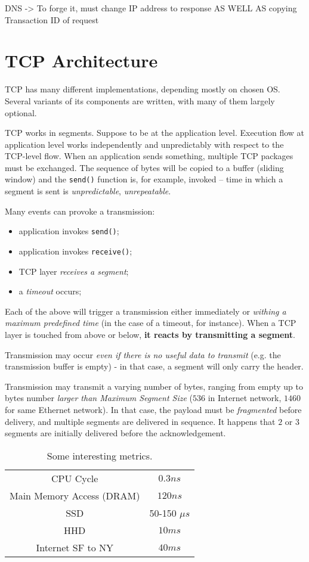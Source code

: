 \documentclass[a4paper, 12pt]{report}
\begin{document}
DNS -> To forge it, must change IP address to response AS WELL AS copying Transaction ID of request


\section{TCP Architecture}

TCP has many different implementations, depending mostly on chosen OS. Several
variants of its components are written, with many of them largely optional.

TCP works in segments. Suppose to be at the application level. Execution flow
at application level works independently and unpredictably with respect to the
TCP-level flow. When an application sends something, multiple TCP packages must
be exchanged. The sequence of bytes will be copied to a buffer (sliding window)
and the \texttt{send()} function is, for example, invoked \--- time in which a
segment is sent is \emph{unpredictable}, \emph{unrepeatable}.

Many events can provoke a transmission:

\begin{itemize}
	\item application invokes \texttt{send()};
	\item application invokes \texttt{receive()};
	\item TCP layer \emph{receives a segment};
	\item a \emph{timeout} occurs;
\end{itemize}

Each of the above will trigger a transmission either immediately or
\emph{withing a maximum predefined time} (in the case of a timeout, for
instance). When a TCP layer is touched from above or below, \textbf{it reacts
by transmitting a segment}.

Transmission may occur \emph{even if there is no useful data to transmit} (e.g.
the transmission buffer is empty) \-- in that case, a segment will only carry
the header.

Transmission may transmit a varying number of bytes, ranging from empty up to
bytes number \emph{larger than Maximum Segment Size} ($536$ in Internet
network, $1460$ for same Ethernet network). In that case, the payload must be
\emph{fragmented} before delivery, and multiple segments are delivered in sequence.
It happens that $2$ or $3$ segments are initially delivered before the
acknowledgement.

\begin{table}[ht]
\centering
\begin{tabular}{cc}
CPU Cycle & $0.3 ns$ \\
Main Memory Access (DRAM) & $120ns$ \\
SSD & 50-150 $\mu s$ \\
HHD & $10 ms$ \\
Internet SF to NY & $40ms$
\end{tabular}
\caption{Some interesting metrics.}\label{tab:SomeMetrics}
\end{table}
\bigskip
\end{document}
